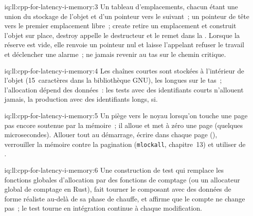 \begin{solution}{iq:ll:cpp-for-latency-i-memory:3}
Un tableau d'emplacements, chacun étant une union du stockage de l'objet et d'un pointeur vers le suivant~; un pointeur de tête vers le premier emplacement libre~; create
retire un emplacement et construit l'objet sur place, destroy appelle le destructeur et le remet dans la . Lorsque la réserve est vide, elle renvoie un pointeur nul et laisse l'appelant refuser
le travail et déclencher une alarme~; ne jamais revenir au tas sur le chemin critique.
\end{solution}

\begin{solution}{iq:ll:cpp-for-latency-i-memory:4}
Les chaînes courtes sont stockées à l'intérieur de l'objet (15~caractères dans la bibliothèque GNU), les longues sur le tas~; l'allocation dépend
des données~: les tests avec des identifiants courts n'allouent jamais, la production avec des identifiants longs, si.
\end{solution}

\begin{solution}{iq:ll:cpp-for-latency-i-memory:5}
Un piège vers le noyau lorsqu'on touche une page pas encore soutenue par la mémoire~; il alloue et met à zéro une page (quelques microsecondes). Allouer
tout au démarrage, écrire dans chaque page (), verrouiller la mémoire contre la pagination (\texttt{mlockall}, chapitre~13) et utiliser
de .
\end{solution}

\begin{solution}{iq:ll:cpp-for-latency-i-memory:6}
Une construction de test qui remplace les fonctions globales d'allocation par des fonctions de comptage (ou un allocateur global de comptage en Rust),
fait tourner le composant avec des données de forme réaliste au-delà de sa phase de chauffe, et affirme que le compte ne change pas~; le test
tourne en intégration continue à chaque modification.
\end{solution}
